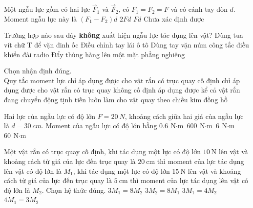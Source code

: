 \begin{ex}
Một ngẫu lực gồm có hai lực $\vec F_1$ và $\vec F_2$, có $F_1 = F_2 = F$ và có cánh tay đòn $d$. Moment ngẫu lực này là	
	\choice
	{$(F_1-F_2)d$}
	{$2Fd$}
	{\True $Fd$}
	{Chưa xác định được}
	\loigiai{}
\end{ex}
\begin{ex}
Trường hợp nào sau đây \textbf{không} xuất hiện ngẫu lực tác dụng lên vật?	
	\choice
	{Dùng tua vít chữ T để vặn đinh ốc}
	{Điều chỉnh tay lái ô tô}
	{Dùng tay vặn núm công tắc điều khiển đài radio}
	{\True Đẩy thùng hàng lên một mặt phẳng nghiêng}
	\loigiai{}
\end{ex}
\begin{ex}
	Chọn nhận định đúng.\\
	Quy tắc moment lực 
	\choice
	{chỉ áp dụng được cho vật rắn có trục quay cố định}
	{chỉ áp dụng được cho vật rắn có trục quay không cố định}
	{\True áp dụng được kể cả vật rắn đang chuyển động tịnh tiến}
	{luôn làm cho vật quay theo chiều kim đồng hồ}
	\loigiai{}
\end{ex}
\begin{ex}
	Hai lực của ngẫu lực có độ lớn $F=\SI{20}{N}$, khoảng cách giữa hai giá của ngẫu lực là $d=\SI{30}{cm}$. Moment của ngẫu lực có độ lớn bằng
	\choice
	{$\SI{0.6}{\newton\cdot\meter}$}
	{$\SI{600}{\newton\cdot\meter}$}
	{\True $\SI{6}{\newton\cdot\meter}$}
	{$\SI{60}{\newton\cdot\meter}$}
\end{ex}
\begin{ex}
	Một vật rắn có trục quay cố định, khi tác dụng một lực có độ lớn $\SI{10}{\newton}$ lên vật và khoảng cách từ giá của lực đến trục quay là $\SI{20}{\centi\meter}$ thì moment của lực tác dụng lên vật có độ lớn là $M_1$, khi tác dụng một lực có độ lớn $\SI{15}{\newton}$ lên vật và khoảng cách từ giá của lực đến trục quay là $\SI{5}{\centi\meter}$ thì moment của lực tác dụng lên vật có độ lớn là $M_2$. Chọn hệ thức đúng.
	\choice
	{\True $3M_1=8M_2$}
	{$3M_2=8M_1$}
	{$3M_1=4M_2$}
	{$4M_1=3M_2$}
	\loigiai{}
\end{ex}

